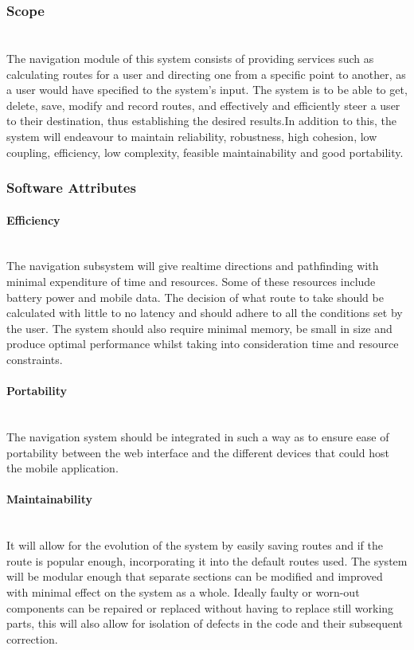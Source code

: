 \subsubsection{Scope}
\paragraph{}
\mbox{}\\
The navigation module of this system consists of providing services such as 
calculating routes for a user and directing one from a specific point to another, 
as a user would have specified to the system’s input. The system is to be able 
to get, delete, save, modify and record routes, and effectively and efficiently steer 
a user to their destination, thus establishing the desired results.In addition to this, 
the system will endeavour to maintain reliability, robustness, high cohesion, 
low coupling, efficiency, low complexity, feasible maintainability and good portability. 


\subsubsection{Software Attributes}

	\paragraph{Efficiency}
	\mbox{}\\
	The navigation subsystem will give realtime directions and pathfinding with minimal 
	expenditure of time and resources. Some of these resources include battery power and mobile 
	data. The decision of what route to take should be calculated with little to no latency and 
	should adhere to all the conditions set by the user. The system should also require minimal 
	memory, be small in size and produce optimal performance whilst taking into consideration 
	time and resource constraints.

	\paragraph{Portability}
	\mbox{}\\
	The navigation system should be integrated in such a way as to ensure ease of portability
	 between the web interface and the different devices that could host the mobile application. 

	\paragraph{Maintainability}
	\mbox{}\\
	It will allow for the evolution of the system by easily saving routes and if the route is 
	popular enough, incorporating it into the default routes used. The system will be modular
	 enough that separate sections can be modified and improved with minimal effect on the 
	 system as a whole. Ideally faulty or worn-out components can be repaired or replaced
	  without having to replace still working parts, this will also allow for isolation of
	  defects in the code and their subsequent correction.
	

